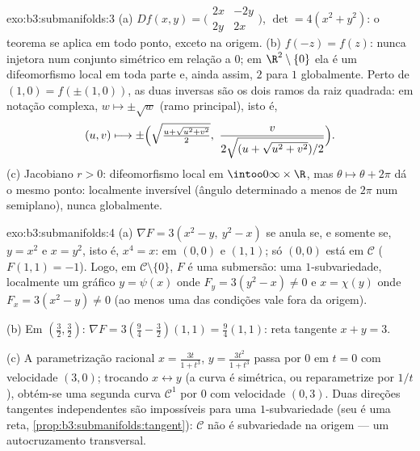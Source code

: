 \begin{solution}{exo:b3:submanifolds:3}
(a) $Df(x,y) = \bigl(\begin{smallmatrix}2x & -2y\\ 2y &
2x\end{smallmatrix}\bigr)$, $\det = 4(x^2 + y^2)$: o
teorema se aplica em todo ponto, exceto na origem.
(b) $f(-z) = f(z)$: nunca injetora num conjunto simétrico em relação a
$0$; em $\R^2\setminus\{0\}$ ela é um difeomorfismo local
em toda parte e, ainda assim, $2$ para $1$ globalmente. Perto de $(1, 0) = f(\pm(1,
0))$, as duas inversas são os dois ramos da raiz quadrada: em
notação complexa, $w \mapsto \pm\sqrt w$ (ramo principal),
isto é,
\[
(u, v) \longmapsto \pm\Bigl(\sqrt{\tfrac{u +
\sqrt{u^2+v^2}}{2}},\ \frac{v}{2\sqrt{(u +
\sqrt{u^2+v^2})/2}}\Bigr).
\]
(c) Jacobiano $r > 0$: difeomorfismo local em
$\intoo0\infty\times\R$, mas $\theta \mapsto \theta + 2\pi$
dá o mesmo ponto: localmente inversível (ângulo determinado a menos
de $2\pi$ num semiplano), nunca globalmente.
\end{solution}

\begin{solution}{exo:b3:submanifolds:4}
(a) $\nabla F = 3(x^2 - y,\ y^2 - x)$ se anula se, e somente se, $y = x^2$
e $x = y^2$, isto é, $x^4 = x$: em $(0,0)$ e $(1,1)$; só
$(0,0)$ está em $\mathcal C$ ($F(1,1) = -1$). Logo, em $\mathcal
C\setminus\{0\}$, $F$ é uma submersão: uma $1$-subvariedade,
localmente um gráfico $y = \psi(x)$ onde $F_y = 3(y^2 - x) \neq 0$
e $x = \chi(y)$ onde $F_x = 3(x^2 - y) \neq 0$ (ao menos
uma das condições vale fora da origem).

(b) Em $(\frac32, \frac32)$: $\nabla F = 3(\frac94 - \frac32)
(1, 1) = \frac94(1,1)$: reta tangente $x + y = 3$.

(c) A parametrização racional $x = \frac{3t}{1 + t^3}$,
$y = \frac{3t^2}{1+t^3}$ passa por $0$ em $t = 0$ com
velocidade $(3, 0)$; trocando $x \leftrightarrow y$ (a
curva é simétrica, ou reparametrize por $1/t$), obtém-se uma segunda
curva $\mathcal C^1$ por $0$ com velocidade $(0, 3)$. Duas
direções tangentes independentes são impossíveis para uma
$1$-subvariedade (seu  é uma reta,
\cref{prop:b3:submanifolds:tangent}): $\mathcal C$ não é
subvariedade na origem --- um autocruzamento transversal.
\end{solution}

